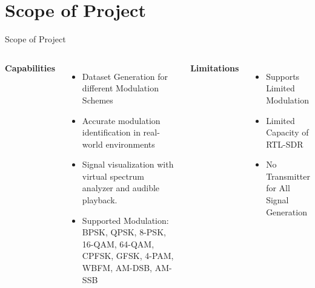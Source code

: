 \section{Scope of Project}
\begin{frame}{Scope of Project}
    \begin{columns}
        \textbf{Capabilities}
        \begin{itemize}
            \item Dataset Generation for different Modulation Schemes
            \item Accurate modulation identification in real-world environments
            \item Signal visualization with virtual spectrum analyzer and audible playback.
            \item Supported Modulation:  BPSK, QPSK, 8-PSK, 16-QAM, 64-QAM, CPFSK, GFSK, 4-PAM, WBFM, AM-DSB, AM-SSB
        \end{itemize}
        \textbf{Limitations}
        \begin{itemize}
            \item Supports Limited Modulation\\[1em]
            \item Limited Capacity of RTL-SDR \\[1em]
            \item No Transmitter for All Signal Generation
        \end{itemize}
    \end{columns}
\end{frame}
